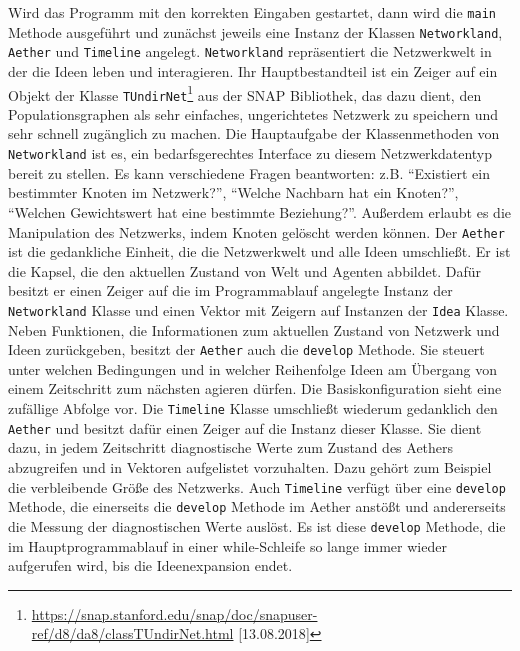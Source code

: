 \documentclass[openany,twoside,twocolumn]{book}
\let\rmarkdownfootnote\footnote%
\def\footnote{\protect\rmarkdownfootnote}
\begin{document}
Wird das Programm mit den korrekten Eingaben gestartet, dann wird die
\texttt{main} Methode ausgeführt und zunächst jeweils eine Instanz der
Klassen \texttt{Networkland}, \texttt{Aether} und \texttt{Timeline}
angelegt. \texttt{Networkland} repräsentiert die Netzwerkwelt in der die
Ideen leben und interagieren. Ihr Hauptbestandteil ist ein Zeiger auf
ein Objekt der Klasse \texttt{TUndirNet}\footnote{\url{https://snap.stanford.edu/snap/doc/snapuser-ref/d8/da8/classTUndirNet.html}
  {[}13.08.2018{]}} aus der SNAP Bibliothek, das dazu dient, den
Populationsgraphen als sehr einfaches, ungerichtetes Netzwerk zu
speichern und sehr schnell zugänglich zu machen. Die Hauptaufgabe der
Klassenmethoden von \texttt{Networkland} ist es, ein bedarfsgerechtes
Interface zu diesem Netzwerkdatentyp bereit zu stellen. Es kann
verschiedene Fragen beantworten: z.B. ``Existiert ein bestimmter Knoten
im Netzwerk?'', ``Welche Nachbarn hat ein Knoten?'', ``Welchen
Gewichtswert hat eine bestimmte Beziehung?''. Außerdem erlaubt es die
Manipulation des Netzwerks, indem Knoten gelöscht werden können. Der
\texttt{Aether} ist die gedankliche Einheit, die die Netzwerkwelt und
alle Ideen umschließt. Er ist die Kapsel, die den aktuellen Zustand von
Welt und Agenten abbildet. Dafür besitzt er einen Zeiger auf die im
Programmablauf angelegte Instanz der \texttt{Networkland} Klasse und
einen Vektor mit Zeigern auf Instanzen der \texttt{Idea} Klasse. Neben
Funktionen, die Informationen zum aktuellen Zustand von Netzwerk und
Ideen zurückgeben, besitzt der \texttt{Aether} auch die \texttt{develop}
Methode. Sie steuert unter welchen Bedingungen und in welcher
Reihenfolge Ideen am Übergang von einem Zeitschritt zum nächsten agieren
dürfen. Die Basiskonfiguration sieht eine zufällige Abfolge vor. Die
\texttt{Timeline} Klasse umschließt wiederum gedanklich den
\texttt{Aether} und besitzt dafür einen Zeiger auf die Instanz dieser
Klasse. Sie dient dazu, in jedem Zeitschritt diagnostische Werte zum
Zustand des Aethers abzugreifen und in Vektoren aufgelistet vorzuhalten.
Dazu gehört zum Beispiel die verbleibende Größe des Netzwerks. Auch
\texttt{Timeline} verfügt über eine \texttt{develop} Methode, die
einerseits die \texttt{develop} Methode im Aether anstößt und
andererseits die Messung der diagnostischen Werte auslöst. Es ist diese
\texttt{develop} Methode, die im Hauptprogrammablauf in einer
while-Schleife so lange immer wieder aufgerufen wird, bis die
Ideenexpansion endet.
\end{document}
